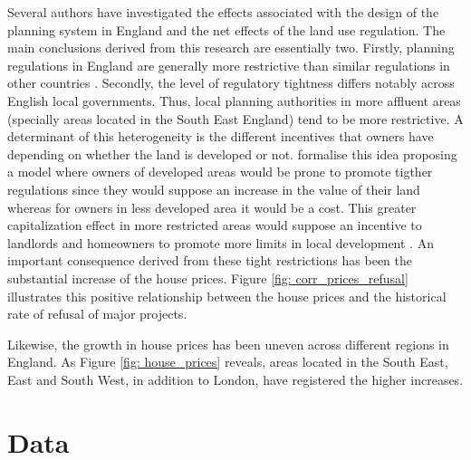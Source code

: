 \documentclass[12pt,letterpaper]{article}
\begin{document}
   Several authors have investigated the effects associated with the design of the planning system in England 
and the net effects of the land use regulation. The main conclusions derived from this research are essentially
 two. Firstly, planning regulations in England are generally more restrictive than similar regulations in other
  countries \citep{cheshire2009, hilber2015}. Secondly, the level of regulatory tightness differs notably across
 English local governments. Thus, local planning authorities
             in more affluent areas (specially areas located in the South East England) 
                 tend to be more restrictive. A determinant of this heterogeneity 
                 is the different incentives that owners have depending on whether the land is developed or not. 
                  \citet{hilber2013origins} 
                 formalise this idea proposing a model where owners of 
                 developed areas would be prone to promote tigther regulations since they would suppose an 
     increase in the value of their land whereas for owners in less developed area it would be a cost. 
     This greater capitalization effect in more restricted areas would suppose an incentive to landlords and homeowners 
      to promote more limits in local development \citep{hilber2015, hilber2016housingpolicies}. An important consequence
       derived from these tight restrictions has been the substantial 
                  increase of the house prices. Figure \ref{fig: corr_prices_refusal} 
                  illustrates this positive relationship between the house 
                  prices and the historical rate of refusal of major projects. 
                  
               {}
                  
                  Likewise, the growth in house prices has been uneven across 
                  different regions in England. As Figure \ref{fig: house_prices} 
                  reveals, areas located in the South East, East and South 
                  West, in addition to London, have registered the higher 
                  increases.  
                  
                                 {}
     
     
   
  
  \section{Data}
  \label{sec:data}
  
\end{document}
